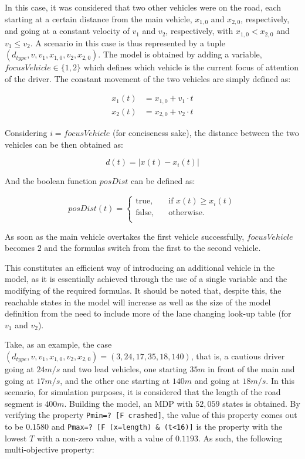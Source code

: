 In this case, it was considered that two other vehicles were on the road, each starting at a certain distance from the main vehicle, $x_{1,0}$ and $x_{2,0}$, respectively, and going at a constant velocity of $v_1$ and $v_2$, respectively, with $x_{1,0} < x_{2,0}$ and $v_1 \leq v_2$. A scenario in this case is thus represented by a tuple $(d_{type}, v, v_1, x_{1,0}, v_2, x_{2,0})$. The model is obtained by adding a variable, $focusVehicle \in \{1,2\}$ which defines which vehicle is the current focus of attention of the driver. The constant movement of the two vehicles are simply defined as:

\begin{equation}
\begin{aligned}
	x_1(t) & = x_{1,0} + v_1\cdot t\\
	x_2(t) & = x_{2,0} + v_2\cdot t
\end{aligned}
\end{equation}

Considering $i = focusVehicle$ (for conciseness sake), the distance between the two vehicles can be then obtained as:

\begin{equation}
	d(t) = \lvert x(t) - x_i(t) \rvert
\end{equation}

And the boolean function $posDist$ can be defined as:

\begin{equation}
posDist(t) = 
     \begin{cases}
       \text{true,} &\quad\text{if }x(t) \geq x_i(t)\\
       \text{false,} &\quad\text{otherwise.} \\
     \end{cases}
\end{equation}

As soon as the main vehicle overtakes the first vehicle successfully, $focusVehicle$ becomes $2$ and the formulas switch from the first to the second vehicle. 

This constitutes an efficient way of introducing an additional vehicle in the model, as it is essentially achieved through the use of a single variable and the modifying of the required formulas. It should be noted that, despite this, the reachable states in the model will increase as well as the size of the model definition from the need to include more of the lane changing look-up table (for $v_1$ and $v_2$). 

Take, as an example, the case $(d_{type}, v, v_1, x_{1,0}, v_2, x_{2,0}) = (3, 24, 17, 35, 18, 140)$, that is, a cautious driver going at $24m/s$ and two lead vehicles, one starting $35m$ in front of the main and going at $17m/s$, and the other one starting at $140m$ and going at $18m/s$. In this scenario, for simulation purposes, it is considered that the length of the road segment is $400m$. Building the model, an MDP with $52,059$ states is obtained. By verifying the property \texttt{Pmin=? [F crashed]}, the value of this property comes out to be $0.1580$ and \texttt{Pmax=? [F (x=length) \& (t<16)]} is the property with the lowest $T$ with a non-zero value, with a value of $0.1193$. As such, the following multi-objective property:

